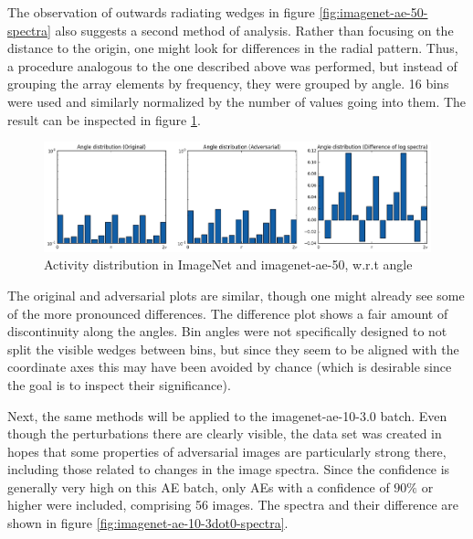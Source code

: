 \documentclass[11pt, a4paper]{article}
\begin{document}
The observation of outwards radiating wedges in figure \ref{fig:imagenet-ae-50-spectra} also suggests a second method of analysis. Rather than focusing on the distance to the origin, one might look for differences in the radial pattern. Thus, a procedure analogous to the one described above was performed, but instead of grouping the array elements by frequency, they were grouped by angle. 16 bins were used and similarly normalized by the number of values going into them. The result can be inspected in figure \ref{fig:imagenet-ae-50-angle}.

\begin{figure}[h!tb]
	\centering
	\includegraphics[width=\textwidth]{images/spectra/imagenet-ae-50-minconfidence-0dot5-maxorig-20000-angle-16-bins.png}
	\caption[Log spectra of ImageNet and adversarial examples, angular analysis]{Activity distribution in ImageNet and imagenet-ae-50, w.r.t angle}
	\label{fig:imagenet-ae-50-angle}
\end{figure}

The original and adversarial plots are similar, though one might already see some of the more pronounced differences. The difference plot shows a fair amount of discontinuity along the angles. Bin angles were not specifically designed to not split the visible wedges between bins, but since they seem to be aligned with the coordinate axes this may have been avoided by chance (which is desirable since the goal is to inspect their significance).


Next, the same methods will be applied to the imagenet-ae-10-3.0 batch. Even though the perturbations there are clearly visible, the data set was created in hopes that some properties of adversarial images are particularly strong there, including those related to changes in the image spectra. Since the confidence is generally very high on this AE batch, only AEs with a confidence of $90\%$ or higher were included, comprising 56 images. The spectra and their difference are shown in figure \ref{fig:imagenet-ae-10-3dot0-spectra}.
\end{document}
